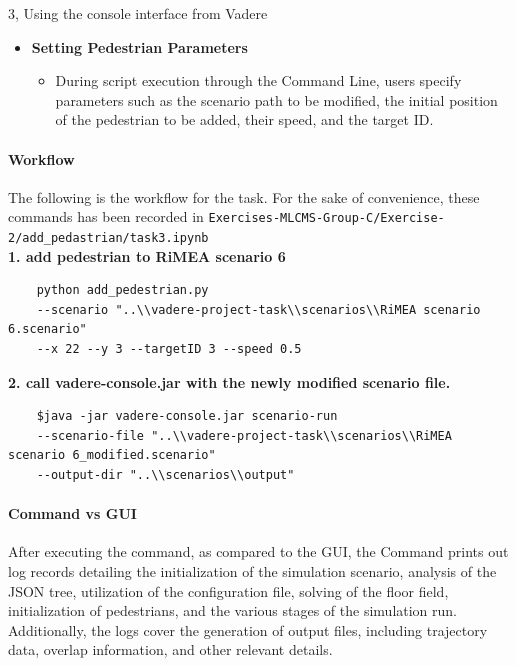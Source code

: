 \begin{task}{3, Using the console interface from Vadere}
\begin{itemize}
    \item \textbf{Setting Pedestrian Parameters}
    \begin{itemize}
        \item During script execution through the Command Line, users specify parameters such as the scenario path to be modified, the initial position of the pedestrian to be added, their speed, and the target ID.
    \end{itemize}
\end{itemize}

\paragraph{Workflow} 
    The following is the workflow for the task. For the sake of convenience, these commands has been  recorded in \texttt{Exercises-MLCMS-Group-C/Exercise-2/add\_pedastrian/task3.ipynb}
\\

\textbf{1. add pedestrian to RiMEA scenario 6}

    \begin{verbatim}
    python add_pedestrian.py 
    --scenario "..\\vadere-project-task\\scenarios\\RiMEA scenario 6.scenario" 
    --x 22 --y 3 --targetID 3 --speed 0.5
    \end{verbatim}

\textbf{2. call vadere-console.jar with the newly modified scenario file.}
    \begin{verbatim}
    $java -jar vadere-console.jar scenario-run
    --scenario-file "..\\vadere-project-task\\scenarios\\RiMEA scenario 6_modified.scenario" 
    --output-dir "..\\scenarios\\output"
    \end{verbatim}

\paragraph{Command vs GUI} 
    After executing the command, as compared to the GUI, the Command prints out log records detailing the initialization of the simulation scenario, analysis of the JSON tree, utilization of the configuration file, solving of the floor field, initialization of pedestrians, and the various stages of the simulation run. Additionally, the logs cover the generation of output files, including trajectory data, overlap information, and other relevant details.


\end{task}
